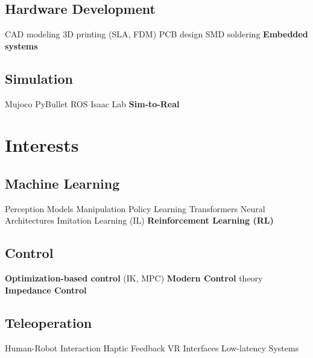 \documentclass[]{deedy-resume-reversed}
\renewcommand{\sectionsep}{\vspace{1.0em}}
\begin{document}
\begin{minipage}[t]{0.33\textwidth}
\subsection{Hardware Development}
CAD modeling \textbullet{} 3D printing (SLA, FDM) \textbullet{} PCB design \textbullet{} SMD soldering \textbullet{} \textbf{Embedded systems}
\sectionsep

\subsection{Simulation}
Mujoco \textbullet{} PyBullet \textbullet{} ROS \textbullet{} Isaac Lab \textbullet{} \textbf{Sim-to-Real}




\section{Interests}
\subsection{Machine Learning}
Perception Models \textbullet{} Manipulation Policy Learning \textbullet{} Transformers \textbullet{} Neural Architectures \textbullet{} Imitation Learning (IL) \textbullet{} \textbf{Reinforcement Learning (RL)}
\sectionsep

\subsection{Control} 
\textbf{Optimization-based control} (IK, MPC) \textbullet{} \textbf{Modern Control} theory \textbullet{} \textbf{Impedance Control}
\sectionsep

\subsection{Teleoperation}
Human-Robot Interaction \textbullet{} Haptic Feedback \textbullet{} VR Interfaces \textbullet{} Low-latency Systems





\end{minipage}
\end{document}
